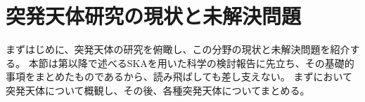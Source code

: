 \section{突発天体研究の現状と未解決問題}\label{transients.s1}
まずはじめに、突発天体の研究を俯瞰し、この分野の現状と未解決問題を紹介する。
本節は第以降で述べるSKAを用いた科学の検討報告に先立ち、その基礎的事項をまとめたものであるから、読み飛ばしても差し支えない。
まずにおいて突発天体について概観し、その後、各種突発天体についてまとめる。









